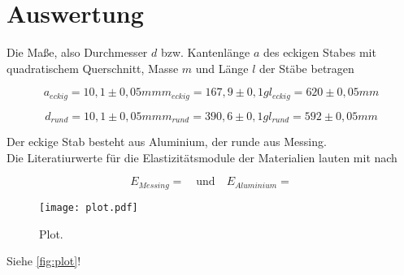 \section{Auswertung}
\label{sec:Auswertung}

Die Maße, also Durchmesser $d$ bzw. Kantenlänge $a$ des eckigen Stabes mit quadratischem Querschnitt, Masse $m$ und Länge $l$ der Stäbe betragen

\begin{equation}
  a_{eckig} = 10,1 \pm 0,05mm
  m_{eckig} = 167,9 \pm 0,1g
  l_{eckig} = 620 \pm 0,05mm
\end{equation}

\begin{equation}
  d_{rund} = 10,1 \pm 0,05mm
  m_{rund} = 390,6 \pm 0,1g
  l_{rund} = 592 \pm 0,05mm
\end{equation}

Der eckige Stab besteht aus Aluminium, der runde aus Messing.\\
Die Literatiurwerte für die Elastizitätsmodule der Materialien lauten mit  nach 

\begin{equation}
  E_{Messing} =   \quad \textrm{und} \quad E_{Aluminium} = 
\end{equation}




\begin{figure}
  \centering
  \texttt{[image: plot.pdf]}
  \caption{Plot.}
  \label{fig:plot}
\end{figure}


Siehe \autoref{fig:plot}! 
